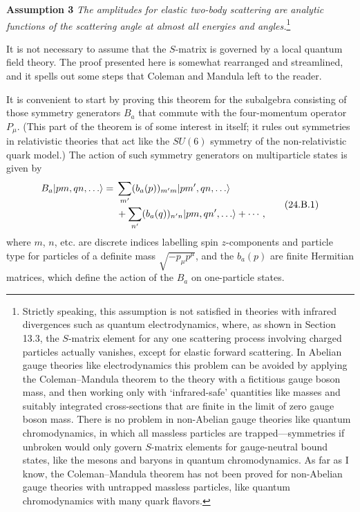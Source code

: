 \medskip
\noindent\textbf{Assumption 3}\quad
\textit{The amplitudes for elastic two-body scattering are analytic functions
of the scattering angle at almost all energies and angles.}\footnote{Strictly
speaking, this assumption is not satisfied in theories with infrared
divergences such as quantum electrodynamics, where, as shown in Section 13.3,
the $S$-matrix element for any one scattering process involving charged
particles actually vanishes, except for elastic forward scattering. In
Abelian gauge theories like electrodynamics this problem can be avoided by
applying the Coleman--Mandula theorem to the theory with a fictitious gauge
boson mass, and then working only with `infrared-safe' quantities like masses
and suitably integrated cross-sections that are finite in the limit of zero
gauge boson mass. There is no problem in non-Abelian gauge theories like
quantum chromodynamics, in which all massless particles are
trapped---symmetries if unbroken would only govern $S$-matrix elements for
gauge-neutral bound states, like the mesons and baryons in quantum
chromodynamics. As far as I know, the Coleman--Mandula theorem has not been
proved for non-Abelian gauge theories with untrapped massless particles, like
quantum chromodynamics with many quark flavors.}

It is not necessary to assume that the $S$-matrix is governed by a local
quantum field theory. The proof presented here is somewhat rearranged and
streamlined, and it spells out some steps that Coleman and Mandula left to the
reader.

It is convenient to start by proving this theorem for the subalgebra
consisting of those symmetry generators $B_a$ that commute with the
four-momentum operator $P_\mu$. (This part of the theorem is of some interest
in itself; it rules out symmetries in relativistic theories that act like the
$SU(6)$ symmetry of the non-relativistic quark model.) The action of such
symmetry generators on multiparticle states is given by
\begin{equation}
\begin{aligned}
 B_a\lvert p m,q n,\ldots\rangle
 ={}&\sum_{m'}(b_a(p))_{m'm}\lvert p m',q n,\ldots\rangle
 \\[-1pt]
 &+\sum_{n'}(b_a(q))_{n'n}\lvert p m,q n',\ldots\rangle+\cdots\,,
\end{aligned}
\tag{24.B.1}\label{eq:24.B.1}
\end{equation}
where $m$, $n$, etc. are discrete indices labelling spin $z$-components and
particle type for particles of a definite mass $\sqrt{-p_\mu p^\mu}$, and the
$b_a(p)$ are finite Hermitian matrices, which define the action of the
$B_a$ on one-particle states.

